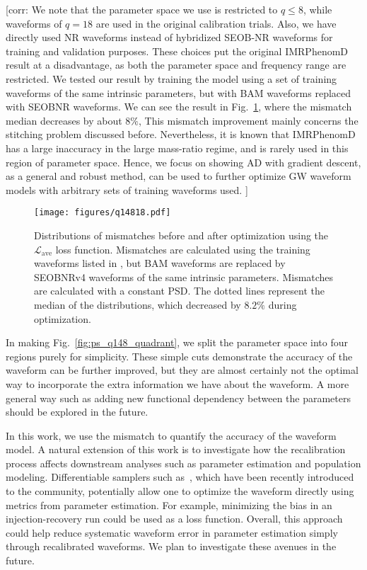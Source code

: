 \documentclass[twocolumn]{aastex631}
\newcommand{\corr}[1]{{\color{red}[corr: #1 ]}}
\begin{document}
\corr{We note that the parameter space we use is restricted to $q\leq8$, while waveforms 
of $q=18$ are used in the original calibration trials. Also, we have directly used NR 
waveforms instead of hybridized SEOB-NR waveforms for training and validation purposes. 
These choices put the original IMRPhenomD result at a disadvantage, as both the parameter 
space and frequency range are restricted. We tested our result by training the model 
using a set of training waveforms of the same intrinsic parameters, but with BAM waveforms 
replaced with SEOBNR waveforms. We can see the result in Fig.~\ref{fig:q14818}, where the 
mismatch median decreases by about $8\%$, This mismatch improvement mainly concerns the 
stitching problem discussed before. Nevertheless, it is known that IMRPhenomD has a large 
inaccuracy in the large mass-ratio regime, and is rarely used in this region of parameter 
space. Hence, we focus on showing AD with gradient descent, as a general and robust method, 
can be used to further optimize GW waveform models with arbitrary sets of training 
waveforms used.} 

\begin{figure}[t]
	\centering
	\texttt{[image: figures/q14818.pdf]}
	\caption{Distributions of mismatches before and after optimization using the 
		$\mathcal{L}_{\mathrm{ave}}$ loss function. Mismatches are calculated using the training waveforms listed in \cite{khan2016frequency}, but BAM waveforms are replaced by SEOBNRv4 waveforms of the same intrinsic parameters. 
		Mismatches are calculated with a constant PSD. The dotted lines represent the median of the distributions, which decreased by $8.2\%$ during optimization.}
	\label{fig:q14818}
\end{figure}

In making Fig.~\ref{fig:ps_q148_quadrant}, we split the parameter space into four regions 
purely for simplicity. These simple cuts demonstrate the accuracy of the waveform can be 
further improved, but they are almost certainly not the optimal way to incorporate the 
extra information we have about the waveform. A more general way such as adding new 
functional dependency between the parameters should be explored in the future.

In this work, we use the mismatch to quantify the accuracy of the waveform model. 
A natural extension of this work is to investigate how the recalibration process affects
downstream analyses such as parameter estimation and population modeling.
Differentiable samplers such as~\citep{Wong:2022xvh}, which have been recently
introduced to the community, potentially allow one to optimize the waveform directly
using metrics from parameter estimation. For example, minimizing the bias in an injection-recovery run
could be used as a loss function. Overall, this approach could help reduce systematic waveform error
in parameter estimation simply through recalibrated waveforms. We plan to investigate these avenues in
the future.
\end{document}
